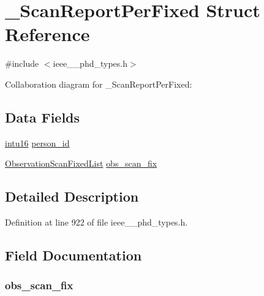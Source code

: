 \hypertarget{struct___scan_report_per_fixed}{}\section{\+\_\+\+Scan\+Report\+Per\+Fixed Struct Reference}
\label{struct___scan_report_per_fixed}


{\ttfamily \#include $<$ieee\+\_\+\_\+phd\+\_\+types.\+h$>$}



Collaboration diagram for \+\_\+\+Scan\+Report\+Per\+Fixed\+:
\subsection*{Data Fields}
\begin{DoxyCompactItemize}
\item 
\hyperlink{ieee__11073__phd__types_8h_a3561595d2aa7416532e1c9910abd076d}{intu16} \hyperlink{struct___scan_report_per_fixed_a508e6969c9e1531b94e99ea24031d53b}{person\+\_\+id}
\item 
\hyperlink{ieee__11073__phd__types_8h_a518767d4e8848833516b3920e33c8e1f}{Observation\+Scan\+Fixed\+List} \hyperlink{struct___scan_report_per_fixed_a029d11d7db952d9b04e728de37c92222}{obs\+\_\+scan\+\_\+fix}
\end{DoxyCompactItemize}


\subsection{Detailed Description}


Definition at line 922 of file ieee\+\_\+\_\+phd\+\_\+types.\+h.



\subsection{Field Documentation}
\hypertarget{struct___scan_report_per_fixed_a029d11d7db952d9b04e728de37c92222}{}
\subsubsection[{obs\+\_\+scan\+\_\+fix}]{ obs\+\_\+scan\+\_\+fix}\label{struct___scan_report_per_fixed_a029d11d7db952d9b04e728de37c92222}


